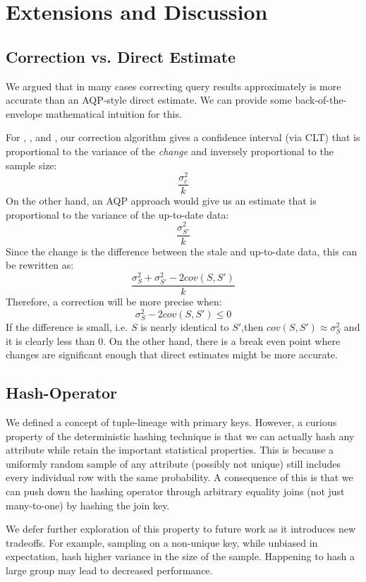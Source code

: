 
\section{Extensions and Discussion}\label{sec:ext}
\subsection{Correction vs. Direct Estimate}
We argued that in many cases correcting query results approximately is more accurate than an
AQP-style direct estimate. 
We can provide some back-of-the-envelope mathematical intuition for this.

For \sumfunc, \countfunc, and \avgfunc, our correction algorithm gives a confidence interval (via CLT) that is
proportional to the variance of the \emph{change} and inversely proportional to the sample size:
\[\frac{\sigma_{c}^2}{k}\]
On the other hand, an AQP approach would give us an estimate that is proportional to the variance of the up-to-date data:
\[\frac{\sigma_{S'}^2}{k}\]
Since the change is the difference between the stale and up-to-date data, this can be rewritten as: 
\[\frac{\sigma_{S}^2 + \sigma_{S'}^2 - 2cov(S,S')}{k}\]
Therefore, a correction will be more precise when:
\[\sigma_{S}^2 - 2cov(S,S') \le 0 \]
If the difference is small, i.e. $S$ is nearly identical to $S'$,then $cov(S,S') \approx \sigma_{S}^2$ and it is clearly less than 0. 
On the other hand, there is a break even point where changes are significant enough that direct estimates might be more accurate.

\subsection{Hash-Operator}
We defined a concept of tuple-lineage with primary keys.
However, a curious property of the deterministic hashing technique is that we can actually hash any attribute while retain the important
statistical properties.
This is because a uniformly random sample of any attribute (possibly not unique) still includes every individual row with the same probability.  
A consequence of this is that we can push down the hashing operator through arbitrary equality joins (not just many-to-one) by hashing the join key.

We defer further exploration of this property to future work as it introduces new tradeoffs.
For example, sampling on a non-unique key, while unbiased in expectation, hash higher variance in the size of the sample.
Happening to hash a large group may lead to decreased performance. 

